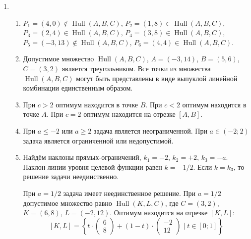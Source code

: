 \documentclass[12pt]{article}
\DeclareMathOperator{\Hull}{Hull}
\DeclareMathOperator{\hull}{\Hull}
\begin{document}
\begin{enumerate}
\begin{enumerate}
  \end{enumerate}
  \item %
  \begin{enumerate}
    \item $P_1 = (4, 0) \notin \hull(A, B, C)$, $P_2 = (1, 8) \in \hull(A, B, C)$, 
    $P_3 = (2, 4) \in \hull(A, B, C)$, $P_4 = (3, 8) \in \hull(A, B, C)$,
    $P_5 = (-3, 13) \notin \hull(A, B, C)$, $P_6 = (4, 4)   \in \hull(A, B, C)$. 
    \item Допустимое множество $\hull(A, B, C)$, $A = (-3, 14)$, $B = (5, 6)$, $C = (3, 2)$ является треугольником. 
    Все точки из множества $\hull(A, B, C)$ могут быть представлены в виде выпуклой линейной комбинации единственным образом. 
    \item При $c > 2$ оптимум находится в точке $B$. 
    При $c < 2$ оптимум находится в точке $A$. 
    При $c = 2$ оптимум находится на отрезке $[A, B]$.
    \item При $a \leq -2$ или $a \geq 2$ задача является неограниченной. 
    При $a \in (-2; 2)$ задача является ограниченной или недопустимой. 
    \item Найдём наклоны прямых-ограничений, $k_1 = -2$, $k_2 = +2$, $k_3 = -a$.
    Наклон линии уровня целевой функции равен $k = -1/2$.
    Если $k = k_3$, то решение задачи неединственно.
    
  

    При $a = 1/2$ задача имеет неединственное решение. 
    При $a = 1/2$ допустимое множество равно $\hull(K, L, C)$, где $C = (3, 2)$, $K = (6, 8)$, $L=(-2, 12)$.
    Оптимум находится на отрезке $[K, L]$: 
    \[
    [K, L] =  \left\{  t \cdot \begin{pmatrix}
      6 \\
      8
    \end{pmatrix}  + (1 - t)  \cdot \begin{pmatrix}
      -2 \\
      12
    \end{pmatrix}   \mid t \in [0;1] \right\}
    \]


  \end{enumerate}


\end{enumerate}
\end{document}
